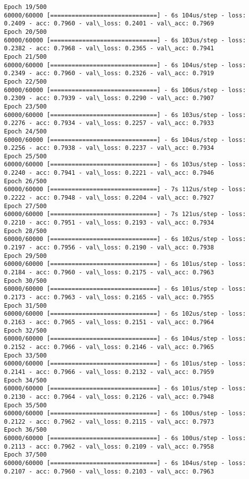 \documentclass[11pt]{article}
\begin{document}
\begin{Verbatim}[commandchars=\\\{\}]
Epoch 19/500
60000/60000 [==============================] - 6s 104us/step - loss: 0.2409 - acc: 0.7960 - val\_loss: 0.2401 - val\_acc: 0.7969
Epoch 20/500
60000/60000 [==============================] - 6s 103us/step - loss: 0.2382 - acc: 0.7968 - val\_loss: 0.2365 - val\_acc: 0.7941
Epoch 21/500
60000/60000 [==============================] - 6s 104us/step - loss: 0.2349 - acc: 0.7960 - val\_loss: 0.2326 - val\_acc: 0.7919
Epoch 22/500
60000/60000 [==============================] - 6s 106us/step - loss: 0.2309 - acc: 0.7939 - val\_loss: 0.2290 - val\_acc: 0.7907
Epoch 23/500
60000/60000 [==============================] - 6s 103us/step - loss: 0.2276 - acc: 0.7934 - val\_loss: 0.2257 - val\_acc: 0.7933
Epoch 24/500
60000/60000 [==============================] - 6s 104us/step - loss: 0.2256 - acc: 0.7938 - val\_loss: 0.2237 - val\_acc: 0.7934
Epoch 25/500
60000/60000 [==============================] - 6s 103us/step - loss: 0.2240 - acc: 0.7941 - val\_loss: 0.2221 - val\_acc: 0.7946
Epoch 26/500
60000/60000 [==============================] - 7s 112us/step - loss: 0.2222 - acc: 0.7948 - val\_loss: 0.2204 - val\_acc: 0.7927
Epoch 27/500
60000/60000 [==============================] - 7s 121us/step - loss: 0.2210 - acc: 0.7951 - val\_loss: 0.2193 - val\_acc: 0.7934
Epoch 28/500
60000/60000 [==============================] - 6s 102us/step - loss: 0.2197 - acc: 0.7956 - val\_loss: 0.2190 - val\_acc: 0.7938
Epoch 29/500
60000/60000 [==============================] - 6s 101us/step - loss: 0.2184 - acc: 0.7960 - val\_loss: 0.2175 - val\_acc: 0.7963
Epoch 30/500
60000/60000 [==============================] - 6s 101us/step - loss: 0.2173 - acc: 0.7963 - val\_loss: 0.2165 - val\_acc: 0.7955
Epoch 31/500
60000/60000 [==============================] - 6s 102us/step - loss: 0.2163 - acc: 0.7965 - val\_loss: 0.2151 - val\_acc: 0.7964
Epoch 32/500
60000/60000 [==============================] - 6s 104us/step - loss: 0.2152 - acc: 0.7966 - val\_loss: 0.2146 - val\_acc: 0.7965
Epoch 33/500
60000/60000 [==============================] - 6s 101us/step - loss: 0.2141 - acc: 0.7966 - val\_loss: 0.2132 - val\_acc: 0.7959
Epoch 34/500
60000/60000 [==============================] - 6s 101us/step - loss: 0.2130 - acc: 0.7964 - val\_loss: 0.2126 - val\_acc: 0.7948
Epoch 35/500
60000/60000 [==============================] - 6s 100us/step - loss: 0.2122 - acc: 0.7962 - val\_loss: 0.2115 - val\_acc: 0.7973
Epoch 36/500
60000/60000 [==============================] - 6s 100us/step - loss: 0.2113 - acc: 0.7962 - val\_loss: 0.2109 - val\_acc: 0.7958
Epoch 37/500
60000/60000 [==============================] - 6s 104us/step - loss: 0.2107 - acc: 0.7960 - val\_loss: 0.2103 - val\_acc: 0.7963

\end{Verbatim}
\end{document}
